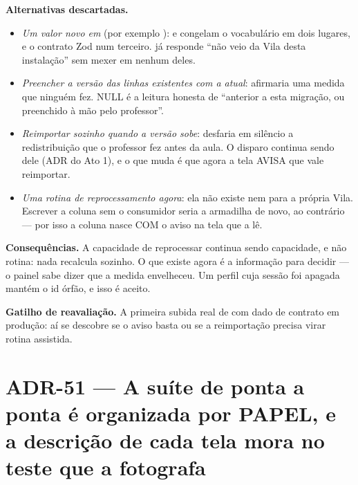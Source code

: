 \textbf{Alternativas descartadas.}
\begin{itemize}
  \item \emph{Um valor novo em } (por exemplo ):
     e 
    congelam o vocabulário em dois lugares, e o contrato Zod num terceiro.
     já responde ``não veio da Vila desta
    instalação'' sem mexer em nenhum deles.
  \item \emph{Preencher a versão das linhas existentes com a atual}: afirmaria
    uma medida que ninguém fez. NULL é a leitura honesta de ``anterior a esta
    migração, ou preenchido à mão pelo professor''.
  \item \emph{Reimportar sozinho quando a versão sobe}: desfaria em silêncio a
    redistribuição que o professor fez antes da aula. O disparo continua sendo
    dele (ADR do Ato 1), e o que muda é que agora a tela AVISA que vale
    reimportar.
  \item \emph{Uma rotina de reprocessamento agora}: ela não existe nem para a
    própria Vila. Escrever a coluna sem o consumidor seria a armadilha de novo,
    ao contrário --- por isso a coluna nasce COM o aviso na tela que a lê.
\end{itemize}

\textbf{Consequências.} A capacidade de reprocessar continua sendo capacidade, e
não rotina: nada recalcula sozinho. O que existe agora é a informação para
decidir --- o painel sabe dizer que a medida envelheceu. Um perfil cuja sessão
foi apagada mantém o id órfão, e isso é aceito.

\textbf{Gatilho de reavaliação.} A primeira subida real de
 com dado de contrato em produção: aí se descobre se o
aviso basta ou se a reimportação precisa virar rotina assistida.

\section{ADR-51 --- A suíte de ponta a ponta é organizada por PAPEL, e a
descrição de cada tela mora no teste que a fotografa}
\label{adr:e2e-por-papel}

